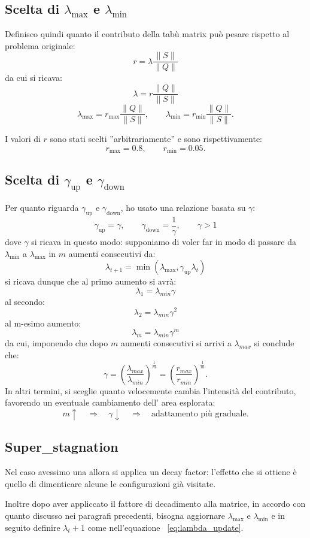 \documentclass[12pt, letterpaper]{article}
\begin{document}
\subsection{Scelta di $\lambda_{\max}$ e $\lambda_{\min}$}
Definisco quindi quanto il contributo della tabù matrix può pesare rispetto al problema originale:
\[
r = \lambda \frac{\| S \|}{\| Q \|}
\]
da cui si ricava:
\[
\lambda =  r \frac{\| Q \|}{\| S \|}
\]
\[
\lambda_{\max} =  r_{\max} \frac{\| Q \|}{\| S \|},
\qquad
\lambda_{\min} = r_{\min} \frac{\|  Q \|}{\| S \|}.
\]

I valori di \(r\) sono stati scelti ''arbitrariamente'' e sono rispettivamente:
\[
r_{\max} = 0.8,
\qquad
r_{\min} = 0.05.
\]

\subsection{Scelta di $\gamma_{\text{up}}$ e $\gamma_{\text{down}}$}
Per quanto riguarda $\gamma_{\text{up}}$ e $\gamma_{\text{down}}$, ho usato una relazione basata su $\gamma$:
\[
\gamma_{\text{up}} = \gamma ,
\qquad
\gamma_{\text{down}} = \frac{1}{\gamma},
\qquad 
\gamma > 1
\] 
dove $\gamma$ si ricava in questo modo: supponiamo di voler far in modo di passare da \(\lambda_{\min}\) a \(\lambda_{\max}\)
in \(m\) aumenti consecutivi da:
\[
\lambda_{t+1} = \min(\lambda_{\max}, \gamma_{\text{up}} \lambda_t)
\]
si ricava dunque che al primo aumento si avrà:
\[
\lambda_1 = \lambda_{min} \gamma
\]
al secondo:
\[
\lambda_2 = \lambda_{min} \gamma^{2}
\]
al m-esimo aumento:
\[
\lambda_m = \lambda_{min} \gamma^{m}
\]
da cui, imponendo che dopo \(m\) aumenti consecutivi si arrivi a $\lambda_{max}$ si conclude che:
\[
\gamma = (\frac{\lambda_{max}}{\lambda_{min}})^\frac{1}{m} = (\frac{r_{max}}{r_{min}})^\frac{1}{m}.
\]
In altri termini, si sceglie quanto velocemente cambia l'intensità del contributo, favorendo un 
eventuale cambiamento dell' area esplorata:
\[
m \uparrow
\quad\Longrightarrow\quad
\gamma \downarrow
\quad\Longrightarrow\quad
\text{adattamento più graduale}.
\]

\subsection{Super\_stagnation}
Nel caso avessimo una  allora si applica un decay factor:
l'effetto che si ottiene è quello di dimenticare alcune le configurazioni
già visitate. 

Inoltre dopo aver appliccato il fattore di decadimento alla matrice, in accordo con quanto discusso 
nei paragrafi precedenti, bisogna aggiornare \(\lambda_{\max}\) e \(\lambda_{\min}\) e in seguito definire 
\(\lambda_t+1\) come nell'equazione ~\eqref{eq:lambda_update}.
\end{document}
